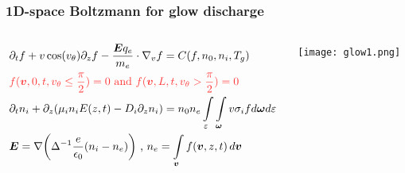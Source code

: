 \documentclass[mathserif, aspectratio=169]{beamer}
\newcommand{\vect}[1]{\boldsymbol{#1}}
\newcommand{\of}[1]{\mleft( #1 \mright)}
\newcommand{\myint}{\int\limits}
\newcommand{\diff}[1]{\, d#1}
\newcommand{\vtheta}{{v_{\theta}}}
\begin{document}
\begin{frame}
	\frametitle{1D-space Boltzmann for glow discharge}
	\begin{columns}
		\begin{column}{0.8\textwidth}
			\footnotesize{
		\begin{align*}
			&\partial_t f + v\cos\of{\vtheta} \partial_z f -\frac{\vect{E}q_e}{m_e}\cdot\nabla_v f = C(f, n_0, n_i, T_g) \\
			&\textcolor{red!80}{f(\vect{v}, 0, t, \vtheta \leq \frac{\pi}{2})	= 0 \text{ and } f(\vect{v}, L, t, \vtheta > \frac{\pi}{2})	= 0}\\
			&\partial_t n_i + \partial_z \of{\mu_i n_i E\of{z,t} -D_i \partial_z n_i} = n_0 n_e \myint_{\varepsilon}\myint_{\vect{\omega}} v \sigma_i f d\vect{\omega} d\varepsilon \\
			& \vect{E} = \nabla \of{\Delta^{-1}\frac{e}{\epsilon_0} \of{n_i- n_e}} \text{ , } n_e = \myint_{\vect{v}} f\of{\vect{v}, z, t} \diff{\vect{v}}
		\end{align*}}
		\end{column}
		\begin{column}{0.3\textwidth}
			\texttt{[image: glow1.png]}
		\end{column}
	\end{columns}
\end{frame}
\end{document}
